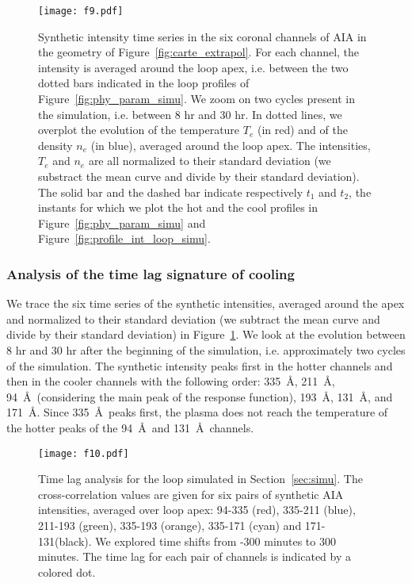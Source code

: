 \documentclass[preprint2]{aastex6}
\begin{document}
	\begin{figure*}  
		\centering
                 \texttt{[image: f9.pdf]}
                 \caption{Synthetic intensity time series in the six coronal channels of AIA in the geometry of Figure~\ref{fig:carte_extrapol}. For each channel, the intensity is averaged around the loop apex, i.e. between the two dotted bars indicated in the loop profiles of Figure~\ref{fig:phy_param_simu}. We zoom on two cycles present in the simulation, i.e. between 8 hr and 30 hr. In dotted lines, we overplot the evolution of the temperature $T_e$ (in red) and of the density $n_e$ (in blue), averaged around the loop apex. The intensities, $T_e$ and $n_e$ are all normalized to their standard deviation (we substract the mean curve and divide by their standard deviation). The solid bar and the dashed bar indicate respectively $t_1$ and $t_2$, the instants for which we plot the hot and the cool profiles in Figure~\ref{fig:phy_param_simu} and Figure~\ref{fig:profile_int_loop_simu}.}
                 \label{fig:int_loop_simu}
	\end{figure*}
		

	\subsubsection{Analysis of the time lag signature of cooling}

We trace the six time series of the synthetic intensities, averaged around the apex and normalized to their standard deviation (we subtract the mean curve and divide by their standard deviation) in Figure~\ref{fig:int_loop_simu}. We look at the evolution between 8 hr and 30 hr after the beginning of the simulation, i.e. approximately two cycles of the simulation. The synthetic intensity peaks first in the hotter channels and then in the cooler channels with the following order: 335~\AA, 211~\AA, 94~\AA~(considering the main peak of the response function), 193~\AA, 131~\AA, and 171~\AA. Since 335~\AA~peaks first, the plasma does not reach the temperature of the hotter peaks of the 94~\AA~and 131~\AA~channels. 
	

	\begin{figure}
		\centering
                 \texttt{[image: f10.pdf]}
                 \caption{Time lag analysis for the loop simulated in Section~\ref{sec:simu}. The cross-correlation values are given for six pairs of synthetic AIA intensities, averaged over loop apex: 94-335 (red), 335-211 (blue), 211-193 (green), 335-193 (orange), 335-171 (cyan) and 171-131(black). We explored time shifts from -300 minutes to 300 minutes. The time lag for each pair of channels is indicated by a colored dot.}
                 \label{fig:correl_int_loop_simu}
	\end{figure}
\end{document}
